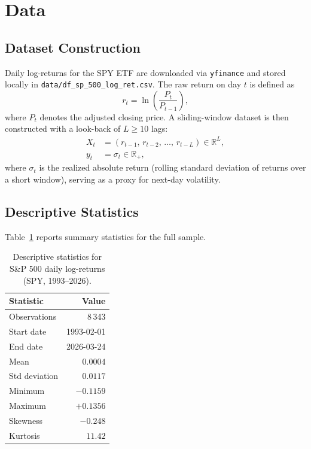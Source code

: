 \section{Data}
\label{sec:data}

\subsection{Dataset Construction}

Daily log-returns for the SPY ETF are downloaded via \texttt{yfinance} and stored
locally in \texttt{data/df\_sp\_500\_log\_ret.csv}. The raw return on day $t$ is
defined as
\[
  r_t = \ln\!\left(\frac{P_t}{P_{t-1}}\right),
\]
where $P_t$ denotes the adjusted closing price. A sliding-window dataset is then
constructed with a look-back of $L \geq 10$ lags:
\begin{align*}
  X_t &= (r_{t-1},\, r_{t-2},\, \ldots,\, r_{t-L}) \in \mathbb{R}^{L}, \\
  y_t &= \sigma_t \in \mathbb{R}_{+},
\end{align*}
where $\sigma_t$ is the realized absolute return (rolling standard deviation of returns
over a short window), serving as a proxy for next-day volatility.

\subsection{Descriptive Statistics}

Table~\ref{tab:stats} reports summary statistics for the full sample.

\begin{table}[H]
  \centering
  \caption{Descriptive statistics for S\&P 500 daily log-returns (SPY, 1993--2026).}
  \label{tab:stats}
  \begin{tabular}{lr}
    \toprule
    Statistic & Value \\
    \midrule
    Observations  & 8\,343 \\
    Start date    & 1993-02-01 \\
    End date      & 2026-03-24 \\
    Mean          & $0.0004$ \\
    Std deviation & $0.0117$ \\
    Minimum       & $-0.1159$ \\
    Maximum       & $+0.1356$ \\
    Skewness      & $-0.248$ \\
    Kurtosis      & $11.42$ \\
    \bottomrule
  \end{tabular}
\end{table}

